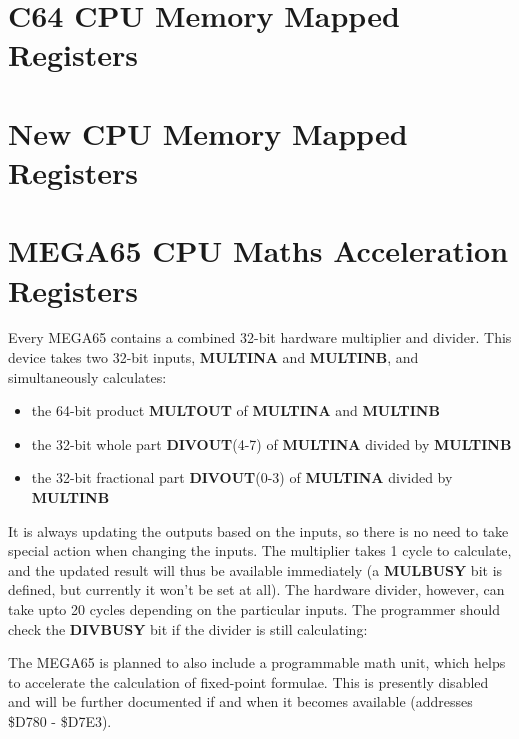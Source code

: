 \section{C64 CPU Memory Mapped Registers}



\section{New CPU Memory Mapped Registers}



\section{MEGA65 CPU Maths Acceleration Registers}

Every MEGA65 contains a combined 32-bit hardware multiplier and divider.
This device takes two 32-bit inputs, {\bf MULTINA} and {\bf MULTINB}, and simultaneously calculates:

\begin{itemize}
\item the 64-bit product {\bf MULTOUT} of {\bf MULTINA} and {\bf MULTINB}
\item the 32-bit whole part {\bf DIVOUT}(4-7) of {\bf MULTINA} divided by {\bf MULTINB}
\item the 32-bit fractional part {\bf DIVOUT}(0-3) of {\bf MULTINA} divided by {\bf MULTINB}
\end{itemize}

It is always updating the outputs based on the inputs, so there is no need to take special action when changing the inputs.
The multiplier takes 1 cycle to calculate, and the updated result will thus be available immediately (a {\bf MULBUSY} bit is
defined, but currently it won't be set at all). The hardware divider, however, can take upto 20 cycles depending on the
particular inputs. The programmer should check the {\bf DIVBUSY} bit if the divider is still calculating:


The MEGA65 is planned to also include a programmable math unit, which helps to accelerate the calculation of fixed-point formulae.
This is presently disabled and will be further documented if and when it becomes available (addresses \$D780 - \$D7E3).

